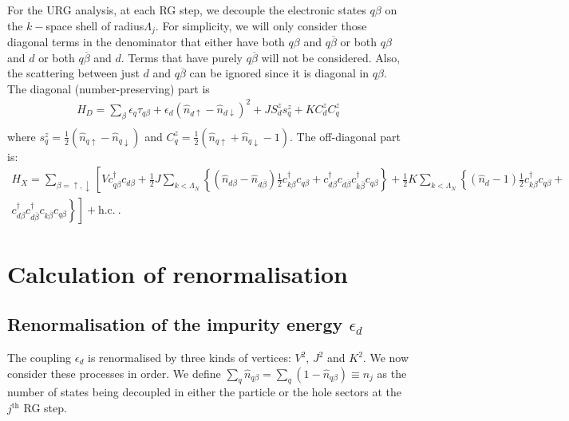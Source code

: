 For the URG analysis, at each RG step, we decouple the electronic states \(q\beta\) on the \(k-\)space shell of radius\(\Lambda_j\). For simplicity, we will only consider those diagonal terms in the denominator that either have both \(q\beta\) and \(q\overline\beta\) or  both \(q\beta\) and \(d\) or both \(q\overline\beta\) and \(d\). Terms that have purely \(q\overline\beta\) will not be considered. Also, the scattering between just \(d\) and \(q\overline\beta\) can be ignored since it is diagonal in \(q\beta\). 
The diagonal (number-preserving) part is
\begin{equation}\begin{aligned}
	H_D = \sum_\beta\epsilon_q\tau_{q\beta} + \epsilon_d \left( \hat n_{d \uparrow} - \hat n_{d \downarrow} \right) ^2 + J S^z_ds^z_{q} + K C^z_d C^z_q\\
\end{aligned}\end{equation}
where \(s_q^z = \frac{1}{2}\left(\hat n_{q\uparrow} - \hat n_{q\downarrow}\right)\) and \(C_q^z = \frac{1}{2}\left(\hat n_{q \uparrow} + \hat n_{q \downarrow} - 1\right)\). The off-diagonal part is:
\begin{equation}\begin{aligned}
	H_X = \sum_{\beta=\uparrow,\downarrow}\left[V c^\dagger_{q\beta}c_{d\beta} + \frac{1}{2}J \sum_{k<\Lambda_N}\left\{\left(\hat n_{d \beta} - \hat n_{d \overline\beta}\right) \frac{1}{2} c^\dagger_{k\beta}c_{q\beta} + c^\dagger_{d\beta}c_{d\overline\beta}c^\dagger_{k\overline\beta}c_{q \beta}\right\} + \frac{1}{2}K \sum_{k<\Lambda_N}\left\{\left(\hat n_d -1\right)\frac{1}{2}c^\dagger_{k\beta}c_{q\beta} + \right.\right.\\
\left.\left.c^\dagger_{d\beta}c^\dagger_{d\overline\beta}c_{k\overline\beta}c_{q\beta}\right\}\right] + \text{h.c.}~.
\end{aligned}\end{equation}

\section{Calculation of renormalisation}
\subsection{Renormalisation of the impurity energy \(\epsilon_d\)}
The coupling \(\epsilon_d\) is renormalised by three kinds of vertices: \(V^2\), \(J^2\) and \(K^2\). We now consider these processes in order. We define \(\sum_q \hat n_{q\beta} = \sum_q \left( 1 - \hat n_{q\beta} \right) \equiv n_j\) as the number of states being decoupled in either the particle or the hole sectors at the \(j^\text{th}\) RG step.

